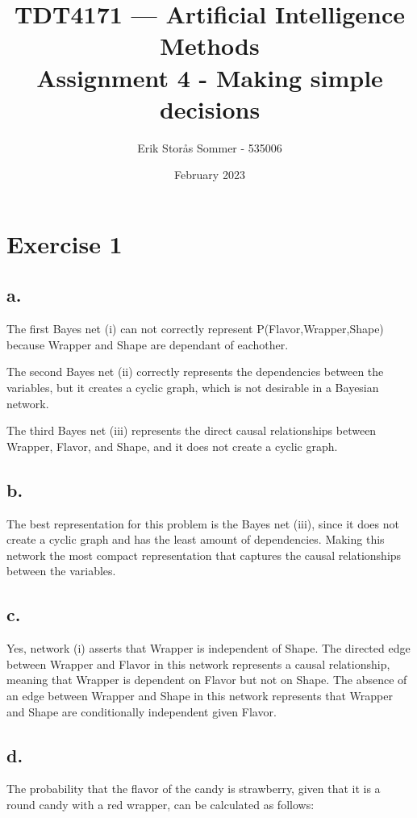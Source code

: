 \documentclass{article}
\title{TDT4171 — Artificial Intelligence Methods \\ Assignment 4 - Making simple decisions}
\author{Erik Storås Sommer - 535006}
\date{February 2023}
\begin{document}
\maketitle

\section*{Exercise 1}

\subsection*{a.}

The first Bayes net (i) can not correctly represent P(Flavor,Wrapper,Shape) because Wrapper and Shape are dependant of eachother.

The second Bayes net (ii) correctly represents the dependencies between the variables, but it creates a cyclic graph, which is not desirable in a Bayesian network.

The third Bayes net (iii) represents the direct causal relationships between Wrapper, Flavor, and Shape, and it does not create a cyclic graph.

\subsection*{b.}

The best representation for this problem is the Bayes net (iii), since it does not create a cyclic graph and has the least amount of dependencies. Making this network the most compact representation that captures the causal relationships between the variables.


\subsection*{c.}

Yes, network (i) asserts that Wrapper is independent of Shape. The directed edge between Wrapper and Flavor in this network represents a causal relationship, meaning that Wrapper is dependent on Flavor but not on Shape. The absence of an edge between Wrapper and Shape in this network represents that Wrapper and Shape are conditionally independent given Flavor.

\subsection*{d.}

The probability that the flavor of the candy is strawberry, given that it is a round candy with a red wrapper, can be calculated as follows:
\end{document}
